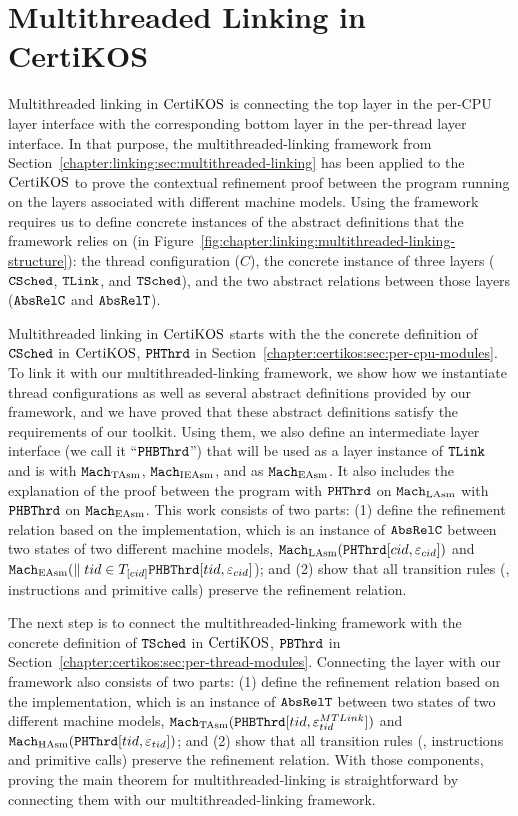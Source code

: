 \section{Multithreaded Linking in CertiKOS}
\label{chapter:certikos:sec:multithreaded-linking-for-certikos}


Multithreaded linking in $\mathrm{CertiKOS}$ is connecting the top layer in the per-CPU layer interface with
the corresponding bottom layer in the per-thread layer interface. 
In that purpose, the multithreaded-linking framework from Section~\ref{chapter:linking:sec:multithreaded-linking} 
has been applied to the $\mathrm{CertiKOS}$ to prove the contextual refinement proof between the program running on the layers associated with different machine models.
Using the framework requires us to define concrete instances 
of the abstract definitions that the framework relies on (in Figure~\ref{fig:chapter:linking:multithreaded-linking-structure}):
the thread configuration ($C$), the concrete instance of three layers (${{\mathrm{\texttt{CSched}}}}$, ${{\mathrm{\texttt{TLink}}}}$, and ${{\mathrm{\texttt{TSched}}}}$), 
and the two abstract relations between those layers (${{\mathrm{\texttt{AbsRelC}}}}$ and ${{\mathrm{\texttt{AbsRelT}}}}$). 

Multithreaded linking in $\mathrm{CertiKOS}$  starts with the the concrete definition of ${{\mathrm{\texttt{CSched}}}}$ in $\mathrm{CertiKOS}$, ${{\mathrm{\texttt{PHThrd}}}}$ in Section~\ref{chapter:certikos:sec:per-cpu-modules}.
To link it with our multithreaded-linking framework,
we show how we instantiate thread configurations as well as several abstract definitions provided by our  framework, and we have proved that these abstract definitions satisfy the requirements of our toolkit.
Using them, we also define an intermediate layer interface (we call it ``${{\mathrm{\texttt{PHBThrd}}}}$'') that will be used as a layer instance of ${{\mathrm{\texttt{TLink}}}}$ and is with ${\mathrm{\texttt{Mach}}}_{\mathrm{TAsm}}$, ${\mathrm{\texttt{Mach}}}_{\mathrm{IEAsm}}$, and as ${\mathrm{\texttt{Mach}}}_{\mathrm{EAsm}}$.
It also includes  the explanation of the proof between the program with  ${{\mathrm{\texttt{PHThrd}}}}$ on ${\mathrm{\texttt{Mach}}}_{\mathrm{LAsm}}$ 
with ${{\mathrm{\texttt{PHBThrd}}}}$ on ${\mathrm{\texttt{Mach}}}_{\mathrm{EAsm}}$. 
This work consists of two parts:  (1) define the refinement relation based on the implementation, which is an instance of ${{\mathrm{\texttt{AbsRelC}}}}$ between two states of two different machine models,
${\mathrm{\texttt{Mach}}}_{\mathrm{LAsm}}({{\mathrm{\texttt{PHThrd}}}}[cid, {\varepsilon}_{cid}])$ and 
${\mathrm{\texttt{Mach}}}_{\mathrm{EAsm}}(\parallel tid \in T_{[cid]} {{\mathrm{\texttt{PHBThrd}}}}[tid, {\varepsilon}_{cid}]$); and 
(2) show that all transition rules (\ie, instructions and primitive calls) preserve the refinement relation. 

The next step is to connect the multithreaded-linking framework with the concrete definition of  ${{\mathrm{\texttt{TSched}}}}$ in $\mathrm{CertiKOS}$, ${{\mathrm{\texttt{PBThrd}}}}$ in Section~\ref{chapter:certikos:sec:per-thread-modules}.
Connecting the layer with our framework also consists of two parts:  (1) define the refinement relation based on the implementation, which is an instance of ${{\mathrm{\texttt{AbsRelT}}}}$ between two states of two different machine models,
${\mathrm{\texttt{Mach}}}_{\mathrm{TAsm}}({{\mathrm{\texttt{PHBThrd}}}}[tid, {\varepsilon}^{MTLink}_{tid}])$ and 
${\mathrm{\texttt{Mach}}}_{\mathrm{HAsm}}({{\mathrm{\texttt{PHThrd}}}}[tid, {\varepsilon}_{tid}])$; and 
(2) show that all transition rules (\ie, instructions and primitive calls) preserve the refinement relation. 
With those components, proving the main theorem for multithreaded-linking is straightforward by connecting 
them with our multithreaded-linking framework.


